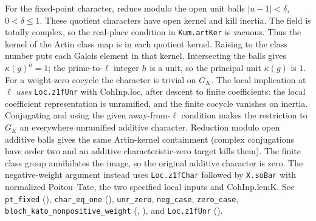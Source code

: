 For the fixed-point character, reduce modulo the open unit balls
$|u-1|<\delta$, $0<\delta\le1$. These quotient characters have open
kernel and kill inertia. The field is totally complex, so the real-place
condition in \nolinkurl{Kum.artKer} is vacuous. Thus the kernel of the Artin
class map is in each quotient kernel. Raising to the class number puts
each Galois element in that kernel. Intersecting the balls gives
$\kappa(g)^h=1$; the prime-to-$\ell$ integer $h$ is a unit, so the
principal unit $\kappa(g)$ is $1$. For a weight-zero cocycle the
character is trivial on $G_K$. The local implication at $\ell$
\emph{uses} \nolinkurl{Loc.z1fUnr} with $\mathrm{CohInp.loc}$, after descent
to finite coefficients: the local coefficient representation is
unramified, and the finite cocycle vanishes on inertia. Conjugating
and using the given away-from-$\ell$ condition makes the restriction to
$G_K$ an everywhere unramified additive character. Reduction modulo open
additive balls gives the same Artin-kernel containment (complex
conjugations have order two and an additive characteristic-zero
target kills them). The finite class group annihilates the image,
so the original additive character is zero. The negative-weight
argument instead uses \nolinkurl{Loc.z1fChar} followed by \nolinkurl{X.soBar}
with normalized Poitou--Tate, the two specified local inputs and
$\mathrm{CohInp.lemK}$. See \nolinkurl{pt_fixed}
(), \nolinkurl{char_eq_one}
(), \nolinkurl{unr_zero},
\nolinkurl{neg_case}, \nolinkurl{zero_case}, \nolinkurl{bloch_kato_nonpositive_weight}
(,
),
and \nolinkurl{Loc.z1fUnr} ().

